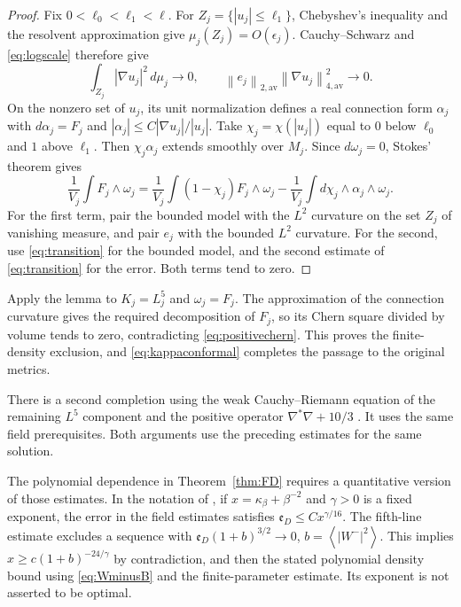 \documentclass[11pt,a4paper]{article}
\theoremstyle{definition}
\theoremstyle{remark}
\newcommand{\norm}[1]{\left\lVert#1\right\rVert}
\newcommand{\av}[1]{\left\langle#1\right\rangle}
\begin{document}
\begin{proof}
Fix $0<\ell_0<\ell_1<\ell$. For $Z_j=\{|u_j|\le\ell_1\}$, Chebyshev's inequality and the resolvent approximation give $\mu_j(Z_j)=O(\epsilon_j)$. Cauchy--Schwarz and \eqref{eq:logscale} therefore give
\begin{equation}
 \int_{Z_j}|\nabla u_j|^2\,d\mu_j\to0,\qquad
 \norm{e_j}_{2,\mathrm{av}}\norm{\nabla u_j}_{4,\mathrm{av}}^2\to0.
 \label{eq:transition}
\end{equation}
On the nonzero set of $u_j$, its unit normalization defines a real connection form $\alpha_j$ with $d\alpha_j=F_j$ and $|\alpha_j|\le C|\nabla u_j|/|u_j|$. Take $\chi_j=\chi(|u_j|)$ equal to $0$ below $\ell_0$ and $1$ above $\ell_1$. Then $\chi_j\alpha_j$ extends smoothly over $M_j$. Since $d\omega_j=0$, Stokes' theorem gives
\[
 \frac1{V_j}\int F_j\wedge\omega_j
 =\frac1{V_j}\int(1-\chi_j)F_j\wedge\omega_j
  -\frac1{V_j}\int d\chi_j\wedge\alpha_j\wedge\omega_j.
\]
For the first term, pair the bounded model with the $L^2$ curvature on the set $Z_j$ of vanishing measure, and pair $e_j$ with the bounded $L^2$ curvature. For the second, use \eqref{eq:transition} for the bounded model, and the second estimate of \eqref{eq:transition} for the error. Both terms tend to zero.
\end{proof}

Apply the lemma to $K_j=L_j^5$ and $\omega_j=F_j$. The approximation of the connection curvature gives the required decomposition of $F_j$, so its Chern square divided by volume tends to zero, contradicting \eqref{eq:positivechern}. This proves the finite-density exclusion, and \eqref{eq:kappaconformal} completes the passage to the original metrics.

There is a second completion using the weak Cauchy--Riemann equation of the remaining $L^5$ component and the positive operator $\nabla^*\nabla+10/3$ \cite{FDfifth}. It uses the same field prerequisites. Both arguments use the preceding estimates for the same solution.

The polynomial dependence in Theorem~\ref{thm:FD} requires a quantitative version of those estimates. In the notation of \cite{FDrates}, if $x=\kappa_\beta+\beta^{-2}$ and $\gamma>0$ is a fixed exponent, the error in the field estimates satisfies $\mathfrak e_D\le Cx^{\gamma/16}$. The fifth-line estimate excludes a sequence with $\mathfrak e_D(1+b)^{3/2}\to0$, $b=\av{|W^-|^2}$. This implies $x\ge c(1+b)^{-24/\gamma}$ by contradiction, and then the stated polynomial density bound using \eqref{eq:WminusB} and the finite-parameter estimate. Its exponent is not asserted to be optimal.
\end{document}
